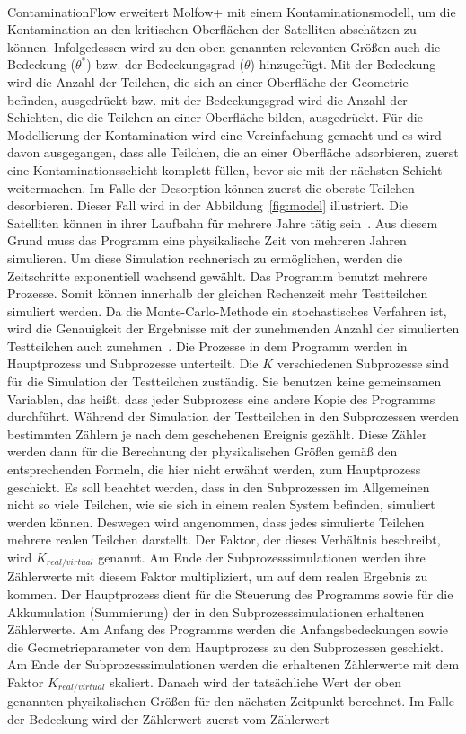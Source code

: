 \documentclass{listhesis}
\begin{document}
\paragraph{}
ContaminationFlow erweitert Molfow+ mit einem Kontaminationsmodell, um die Kontamination an den kritischen Oberflächen der Satelliten abschätzen zu können. Infolgedessen wird zu den oben genannten relevanten Größen auch die Bedeckung ($\theta^*$) bzw. der Bedeckungsgrad ($\theta$) hinzugefügt. Mit der Bedeckung wird die Anzahl der Teilchen, die sich an einer Oberfläche der Geometrie befinden, ausgedrückt bzw. mit der Bedeckungsgrad wird die Anzahl der Schichten, die die Teilchen an einer Oberfläche bilden, ausgedrückt. Für die Modellierung der Kontamination wird eine Vereinfachung gemacht und es wird davon ausgegangen, dass alle Teilchen, die an einer Oberfläche adsorbieren, zuerst eine Kontaminationsschicht komplett füllen, bevor sie mit der nächsten Schicht weitermachen. Im Falle der Desorption können zuerst die oberste Teilchen desorbieren. Dieser Fall wird in der Abbildung~\ref{fig:model} illustriert. Die Satelliten können in ihrer Laufbahn für mehrere Jahre tätig sein~\cite{jiao}. Aus diesem Grund muss das Programm eine physikalische Zeit von mehreren Jahren simulieren. Um diese Simulation rechnerisch zu ermöglichen, werden die Zeitschritte exponentiell wachsend gewählt. Das Programm benutzt mehrere Prozesse. Somit können innerhalb der gleichen Rechenzeit mehr Testteilchen simuliert werden. Da die Monte-Carlo-Methode ein stochastisches Verfahren ist, wird die Genauigkeit der Ergebnisse mit der zunehmenden Anzahl der simulierten Testteilchen auch zunehmen~\cite{fenrg}. Die Prozesse in dem Programm werden in Hauptprozess und Subprozesse unterteilt. Die $K$ verschiedenen Subprozesse sind für die Simulation der Testteilchen zuständig. Sie benutzen keine gemeinsamen Variablen, das heißt, dass jeder Subprozess eine andere Kopie des Programms durchführt. Während der Simulation der Testteilchen in den Subprozessen werden bestimmten Zählern je nach dem geschehenen Ereignis gezählt. Diese Zähler werden dann für die Berechnung der physikalischen Größen gemäß den entsprechenden Formeln, die hier nicht erwähnt werden, zum Hauptprozess geschickt. Es soll beachtet werden, dass in den Subprozessen im Allgemeinen nicht so viele Teilchen, wie sie sich in einem realen System befinden, simuliert werden können. Deswegen wird angenommen, dass jedes simulierte Teilchen mehrere realen Teilchen darstellt. Der Faktor, der dieses Verhältnis beschreibt, wird $K_{real/virtual}$ genannt. Am Ende der Subprozesssimulationen werden ihre Zählerwerte mit diesem Faktor multipliziert, um auf dem realen Ergebnis zu kommen. Der Hauptprozess dient für die Steuerung des Programms sowie für die Akkumulation (Summierung) der in den Subprozesssimulationen erhaltenen Zählerwerte. Am Anfang des Programms werden die Anfangsbedeckungen sowie die Geometrieparameter von dem Hauptprozess zu den Subprozessen geschickt. Am Ende der Subprozesssimulationen werden die erhaltenen Zählerwerte mit dem Faktor $K_{real/virtual}$ skaliert. Danach wird der tatsächliche Wert der oben genannten physikalischen Größen für den nächsten Zeitpunkt berechnet. Im Falle der Bedeckung wird der Zählerwert zuerst vom Zählerwert 
\end{document}
